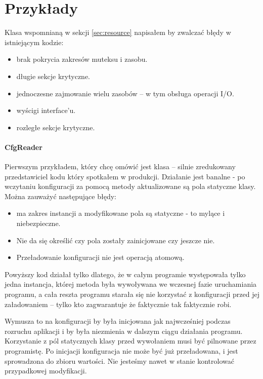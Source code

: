 \section{Przykłady}\label{sec:examples}
Klasa  wspomnianą w sekcji \ref{sec:resource} napisałem by zwalczać błędy w istniejącym kodzie:
\begin{itemize}
\item brak pokrycia zakresów muteksu i zasobu.
\item długie sekcje krytyczne.
\item jednoczesne zajmowanie wielu zasobów -- w tym obsługa operacji I/O.
\item wyścigi interface'u.
\item rozległe sekcje krytyczne.
\end{itemize}

\paragraph{CfgReader}
Pierwszym przykładem, który chcę omówić jest klasa  -- silnie zredukowany przedstawiciel kodu który spotkałem w produkcji. Działanie jest banalne - po wczytaniu konfiguracji za pomocą metody  aktualizowane są pola statyczne klasy.
Można zauważyć następujące błędy:
\begin{itemize}
\item {} ma zakres instancji a modyfikowane pola są statyczne - to mylące i niebezpieczne.
\item Nie da się określić czy pola zostały zainicjowane czy jeszcze nie.
\item Przeładowanie konfiguracji nie jest operacją atomową.
\end{itemize}
Powyższy kod działał tylko dlatego, że w całym programie występowała tylko jedna instancja, której metoda była wywoływana we wczesnej fazie uruchamiania programu, a cała reszta programu starała się nie korzystać z konfiguracji przed jej załadowaniem -- tylko kto zagwarantuje że faktycznie tak faktycznie robi.

Wymusza to na konfiguracji by była inicjowana jak najwcześniej podczas rozruchu aplikacji i by była niezmienia w dalszym ciągu działania programu. Korzystanie z pól statycznych klasy przed wywołaniem  musi być pilnowane przez programistę. Po inicjacji konfiguracja nie może być już przeładowana, i jest sprowadzona do zbioru wartości. Nie jesteśmy nawet w stanie kontrolować przypadkowej modyfikacji.


